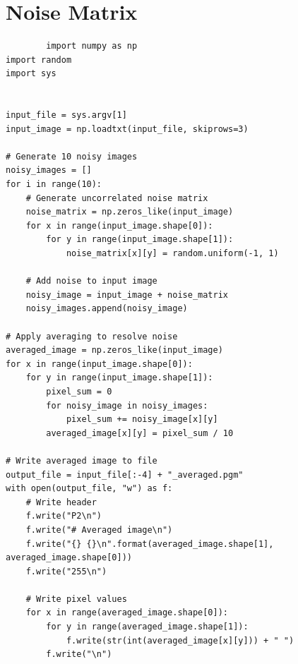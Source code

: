 \documentclass[a4paper,8pt]{article}
\begin{document}
        \section{Noise Matrix}
        \begin{verbatim}
        import numpy as np
import random
import sys

    
input_file = sys.argv[1]
input_image = np.loadtxt(input_file, skiprows=3)

# Generate 10 noisy images
noisy_images = []
for i in range(10):
    # Generate uncorrelated noise matrix
    noise_matrix = np.zeros_like(input_image)
    for x in range(input_image.shape[0]):
        for y in range(input_image.shape[1]):
            noise_matrix[x][y] = random.uniform(-1, 1)
    
    # Add noise to input image
    noisy_image = input_image + noise_matrix
    noisy_images.append(noisy_image)

# Apply averaging to resolve noise
averaged_image = np.zeros_like(input_image)
for x in range(input_image.shape[0]):
    for y in range(input_image.shape[1]):
        pixel_sum = 0
        for noisy_image in noisy_images:
            pixel_sum += noisy_image[x][y]
        averaged_image[x][y] = pixel_sum / 10

# Write averaged image to file
output_file = input_file[:-4] + "_averaged.pgm"
with open(output_file, "w") as f:
    # Write header
    f.write("P2\n")
    f.write("# Averaged image\n")
    f.write("{} {}\n".format(averaged_image.shape[1], averaged_image.shape[0]))
    f.write("255\n")

    # Write pixel values
    for x in range(averaged_image.shape[0]):
        for y in range(averaged_image.shape[1]):
            f.write(str(int(averaged_image[x][y])) + " ")
        f.write("\n")



        \end{verbatim}
        
\end{document}
